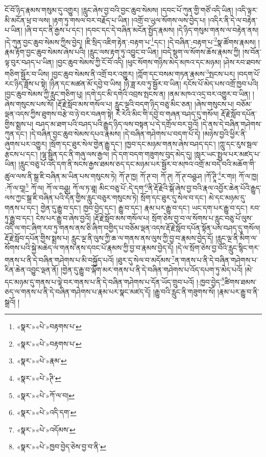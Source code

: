 ངོ་བོ་ཉིད་རྣམས་གསུམ་དུ་འགྱུར། །རླུང་ཞེས་བྱ་བའི་བྱང་ཆུབ་སེམས། །དབང་པོ་ཀུན་གྱི་གཙོ་འདི་ཡིན། །འདི་ལྟར་མི་མངོན་ཕྲ་བ་ལས། །རྟག་ཏུ་གསལ་བར་བརྗོད་པ་ཡིན། །འགྲོ་བ་ཡུལ་སོགས་ལས་བྱེད་པ། །འདིར་ནི་དེ་ལ་བརྟེན་པ་ཡིན། །ཞི་བ་དང་ནི་རྒྱས་པ་དང་། །དབང་དང་དེ་བཞིན་མངོན་སྤྱོད་རྣམས། །དེ་ཉིད་གསུམ་གནས་ལ་བརྟེན་ནས། །དེ་ཀུན་བྱང་ཆུབ་སེམས་ཀྱིས་བྱེད། །ཇི་སྲིད་འཇིག་རྟེན་:བརྟག་པ་\footnote{«སྣར་»«པེ་»བརྟགས་པ་}དང་། །དེ་བཞིན་:བརྟག་པ་\footnote{«སྣར་»«པེ་»བརྟགས་པ་}སྣ་ཚོགས་རྣམས། །རྣམ་རྟོག་བྱང་ཆུབ་སེམས་ཞེས་པའི། །རླུང་ལས་རྟག་ཏུ་འབྱུང་བ་ཡིན། །བདེ་སྡུག་ལ་སོགས་ཆོས་རྣམས་ཀྱི། །ས་བོན་ལྟ་བུར་བཤད་པ་ཡིན། །བྱང་ཆུབ་སེམས་ཀྱི་ངོ་བོ་འདི། །ཕུང་སོགས་གཉིས་མེད་མཁའ་དང་མཉམ། །ཤེས་རབ་ཐབས་གཅིག་སྦྱོར་བ་ཡིས། །བྱང་ཆུབ་སེམས་ནི་འགྲོ་བར་འགྱུར། །ཀློག་དང་བསམ་གཏན་རྣམས་\footnote{«སྣར་»«པེ་»རྣམ་}སྤངས་པར། །བདག་པོ་རང་ཉིད་ཟློས་པ་སྟེ། །ཉིན་དང་མཚན་མོ་དབྱེ་བ་ཡིས། །ཉི་ཟླ་རབ་ཏུ་སྦྱོར་བ་ཡིན། དངོས་པོ་མེད་པས་འགྲོ་ཁྱབ་པའི། །བྱང་ཆུབ་སེམས་ཀྱི་རླུང་གཅིག་པུ། །དགེ་དང་མི་དགེའི་འབྲས་སྤངས་ན། །ནམ་མཁའ་འདྲ་བར་འགྱུར་བ་ཡིན། །ཞེས་གསུངས་པས་སོ། །རྡོ་རྗེ་སློབ་མས་གསོལ་པ། རླུང་ལྔའི་བདག་ཉིད་བཅུ་མིང་ཅན། །ཞེས་གསུངས་པ། བཅོམ་ལྡན་འདས་ཀྱིས་ཐུགས་བརྩེ་བ་ཉེ་བར་བཞག་སྟེ། རེ་རེའི་མིང་གི་དབྱེ་བ་གཞན་བཤད་དུ་གསོལ། རྡོ་རྗེ་སློབ་དཔོན་གྱིས་སྨྲས་པ། བཤད་མ་ཐག་པའི་བཤད་པའི་རྒྱུད་ཉིད་ལས་བསྟན་པ་དེ་དགྲོལ་བར་བྱའོ། །དེ་ནས་དེ་བཞིན་གཤེགས་ཀུན་དང་། །དེ་བཞིན་བྱང་ཆུབ་སེམས་དཔའ་རྣམས། །དེ་བཞིན་གཤེགས་པ་བདག་པོ་དེ། །མཉེས་བྱའི་ཕྱིར་ནི་ཞུགས་པར་འགྱུར། །སྲོག་དང་ཐུར་སེལ་གྱེན་རྒྱུ་དང་། །ཁྱབ་དང་མཉམ་གནས་ཞེས་བཤད་དང་། །ཀླུ་དང་རུས་སྦལ་རྩངས་པ་དང་། །ལྷ་སྦྱིན་དང་ནི་གཞུ་ལས་རྒྱལ། །དེ་དག་བདག་གཟུགས་བུད་མེད་དུ། །སླར་ཡང་སྤྲུལ་པར་མཛད་པ་ཡིན། །རླུང་བཅུ་པོ་འདི་དག་ནི་སངས་རྒྱས་ཐམས་ཅད་དང་མཉམ་པར་སྦྱོར་བ་མཁའ་འགྲོ་མ་བདེ་བའི་མཆོག་གི་ཚུལ་ལས་ནི་སྒྲ་ཇི་བཞིན་མ་ཡིན་པས་གསུངས་ཏེ། ཀོ་ཊ་ཁྱ། ཀོ་ཊ་བ། ཀོ་ཊ། ཀོ་ཊ་བཤྩ་ཤ །ཀོ་ཊཱི་\footnote{«སྣར་»«པེ་»ཊི་}ར་གཿ། ཀོ་ལ་ཁྱ། :ཀོ་ལ་བཱ།\footnote{«སྣར་»«པེ་»ཀོ་ལ་བ།} ཀོ་ལ། ཀོ་ལ་བཤྩ། ཀོ་ལ་ཏ་ཐཱ། མིང་བཅུ་པོ་:དེ་དག་\footnote{«སྣར་»«པེ་»འདི་དག་}ནི་རྡོ་རྗེའི་སྒོ་ཞེས་བྱ་བའི་རྣལ་འབྱོར་ཆེན་པོའི་རྒྱུད་ལས་ཀྱང་སྒྲ་ཇི་བཞིན་པའི་དོན་གྱིས་རླུང་བཅུར་གསུངས་ཏེ། སྲོག་དང་ཐུར་དུ་སེལ་བ་དང་། མེ་དང་མཉམ་དུ་གནས་པ་དང་། གྱེན་དུ་རྒྱུ་བ་དང་། ཁྱབ་བྱེད་དང་། རྒྱུ་བ་དང་། རྣམ་པར་རྒྱུ་བ་དང་། ཡང་དག་པར་རྒྱུ་བ་དང་། རབ་ཏུ་རྒྱུ་བ་དང་། ངེས་པར་རྒྱུ་བ་ཞེས་བྱའོ། །རྡོ་རྗེ་སློབ་མས་གསོལ་པ། སྲོག་ཅེས་བྱ་བ་ལ་སོགས་པ་རླུང་བཅུ་པོ་ལུས་འདི་ལ་གང་ཞིག་རབ་ཏུ་གནས་ནས་ཅི་ཞིག་བགྱིད་པ་བཅོམ་ལྡན་འདས་རྡོ་རྗེ་སློབ་དཔོན་སྟོན་པས་བཤད་དུ་གསོལ། རྡོ་རྗེ་སློབ་དཔོན་གྱིས་སྨྲས་པ། རླུང་ལྔ་ནི་ལུས་ཀྱི་ཆ་ལ་གནས་ནས་ལུས་ཀྱི་བྱ་བ་རྣམས་བྱེད་དོ། །རླུང་ལྔ་ནི་མིག་ལ་སོགས་པའི་སྐྱེ་མཆེད་ལ་གནས་ནས་དབང་པོ་རྣམས་ཀྱི་བྱ་བ་རྣམས་བྱེད་དོ། །དེ་ལ་སྲོག་ཅེས་བྱ་བའི་རླུང་སྙིང་གར་གནས་པ་ནི་དེ་བཞིན་གཤེགས་པ་མི་བསྐྱོད་པའོ། །ཐུར་དུ་སེལ་བ་མདོམས་\footnote{«སྣར་»«པེ་»འདོམས་}ན་གནས་པ་ནི་དེ་བཞིན་གཤེགས་པ་རིན་ཆེན་འབྱུང་ལྡན་ནོ། །གྱེན་དུ་རྒྱུ་བ་ལྐོག་མར་གནས་པ་ནི་དེ་བཞིན་གཤེགས་པ་འོད་དཔག་ཏུ་མེད་པའོ། །མེ་དང་མཉམ་དུ་གནས་པ་ལྟེ་བར་གནས་པ་ནི་དེ་བཞིན་གཤེགས་པ་དོན་ཡོད་གྲུབ་པའོ། །:ཁྱབ་བྱེད་\footnote{«སྣར་»«པེ་»ཁྱབ་བྱེད་ཅེས་བྱ་བ་ནི་}ཚིགས་ཐམས་ཅད་ལ་གནས་པ་ནི་དེ་བཞིན་གཤེགས་པ་རྣམ་པར་སྣང་མཛད་དོ། །རྒྱུ་བའི་རླུང་ནི་གཟུགས་སོ། །རྣམ་པར་རྒྱུ་བ་ནི་སྒྲའོ། །
